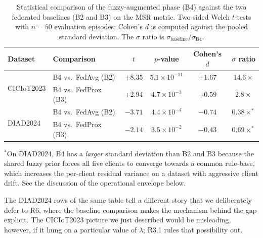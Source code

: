 \documentclass[ai,article,submit,moreauthors,pdftex]{Definitions/mdpi}
\begin{document}
\begin{table}[!htbp]
  \centering
  \caption{Statistical comparison of the fuzzy-augmented phase (B4)
  against the two federated baselines (B2 and B3) on the MSR metric.
  Two-sided Welch $t$-tests with $n = 50$ evaluation episodes; Cohen's
  $d$ is computed against the pooled standard deviation. The $\sigma$
  ratio is $\sigma_{\text{baseline}}/\sigma_{\text{B4}}$.}\label{tab:stats}
  \small
  \begin{tabular}{@{}llcccc@{}}
    \toprule
    \textbf{Dataset} & \textbf{Comparison} & $t$ & $p$-value & \textbf{Cohen's $d$} & $\sigma$ \textbf{ratio} \\
    \midrule
    \multirow{2}{*}{CICIoT2023}
      & B4 vs.\ FedAvg (B2)  & $+8.35$ & $5.1 \times 10^{-11}$ & $+1.67$ & $14.6\times$ \\
      & B4 vs.\ FedProx (B3) & $+2.94$ & $4.7 \times 10^{-3}$  & $+0.59$ & $2.8\times$ \\
    \midrule
    \multirow{2}{*}{DIAD2024}
      & B4 vs.\ FedAvg (B2)  & $-3.71$ & $4.4 \times 10^{-4}$  & $-0.74$ & $0.38\times^{\ast}$ \\
      & B4 vs.\ FedProx (B3) & $-2.14$ & $3.5 \times 10^{-2}$  & $-0.43$ & $0.69\times^{\ast}$ \\
    \bottomrule
  \end{tabular}

  \vspace{0.25em}
  {\footnotesize $^{\ast}$On DIAD2024, B4 has a \emph{larger} standard
  deviation than B2 and B3 because the shared fuzzy prior forces all five
  clients to converge towards a common rule-base, which increases the
  per-client residual variance on a dataset with aggressive client drift.
  See the discussion of the operational envelope below.}
\end{table}

The DIAD2024 rows of the same table tell a different story that we
deliberately defer to R6, where the baseline comparison makes the
mechanism behind the gap explicit. The CICIoT2023 picture we just
described would be misleading, however, if it hung on a particular
value of $\lambda$; R3.1 rules that possibility out.
\end{document}
